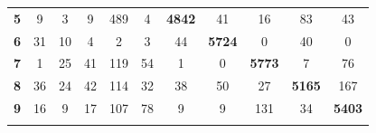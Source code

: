 \documentclass[
	12pt,				%
	openright,			%
	twoside,			%
	a4paper,			%
	english,			%
	brazil,				%
	svgnames
	]{abntex2}\usepackage[]{graphicx}\usepackage[]{color}
\begin{document}
\begin{table}[h]
\begin{tabular}{rcccccccccc}
\multicolumn{1}{r|}{\textbf{5}}           & 9                                  & 3                                  & 9                                  & 489                                & \multicolumn{1}{c|}{4}             & \multicolumn{1}{c|}{\textbf{4842}} & 41                                 & 16                                 & 83                                 & 43                                 \\ \cline{7-8}
\multicolumn{1}{r|}{\textbf{6}}           & 31                                 & 10                                 & 4                                  & 2                                  & 3                                  & \multicolumn{1}{c|}{44}            & \multicolumn{1}{c|}{\textbf{5724}} & 0                                  & 40                                 & 0                                  \\ \cline{8-9}
\multicolumn{1}{r|}{\textbf{7}}           & 1                                  & 25                                 & 41                                 & 119                                & 54                                 & 1                                  & \multicolumn{1}{c|}{0}             & \multicolumn{1}{c|}{\textbf{5773}} & 7                                  & 76                                 \\ \cline{9-10}
\multicolumn{1}{r|}{\textbf{8}}           & 36                                 & 24                                 & 42                                 & 114                                & 32                                 & 38                                 & 50                                 & \multicolumn{1}{c|}{27}            & \multicolumn{1}{c|}{\textbf{5165}} & 167                                \\ \cline{10-11} 
\multicolumn{1}{r|}{\textbf{9}}           & 16                                 & 9                                  & 17                                 & 107                                & 78                                 & 9                                  & 9                                  & 131                                & \multicolumn{1}{c|}{34}            & \multicolumn{1}{c|}{\textbf{5403}} \\ \hline
\textbf{}                                 &                                    &                                    &                                    &                                    &                                    &                                    &                                    &                                    &                                    &                                    \\ \hline

\end{tabular}
\end{table}
\end{document}

